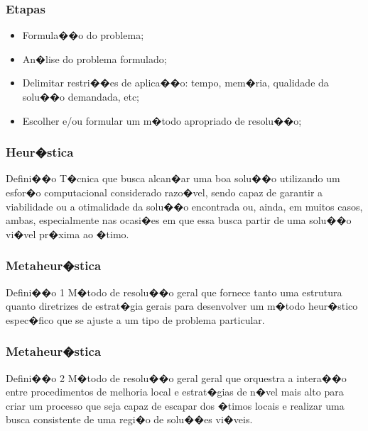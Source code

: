 \documentclass[fleqn]{beamer}
\begin{document}
\begin{frame}
	\frametitle{Etapas}
	\begin{itemize}
		\item Formula��o do problema;
		\item An�lise do problema formulado;
		\item Delimitar restri��es de aplica��o: tempo, mem�ria, qualidade da solu��o demandada, etc;
		\item Escolher e/ou formular um m�todo apropriado de resolu��o;
	\end{itemize}
\end{frame}
\begin{frame}
\frametitle{Heur�stica}
\begin{block}{Defini��o \cite{goldbargLuna2005}}
T�cnica que busca alcan�ar uma boa solu��o utilizando um esfor�o computacional considerado razo�vel, sendo capaz de garantir a viabilidade ou a otimalidade da solu��o encontrada ou, ainda, em muitos casos, ambas, especialmente nas ocasi�es em que essa busca partir de uma solu��o vi�vel pr�xima ao �timo.
\end{block}
\end{frame}
\begin{frame}
	\frametitle{Metaheur�stica}
	\begin{block}{Defini��o 1 \cite{hillierLieberman2010}}
		M�todo de resolu��o geral que fornece tanto uma estrutura quanto diretrizes de estrat�gia gerais para desenvolver um m�todo heur�stico espec�fico que se ajuste a um tipo de problema particular.
	\end{block}
\end{frame}
\begin{frame}
	\frametitle{Metaheur�stica}
	\begin{block}{Defini��o 2 \cite{hillierLieberman2010}}
		M�todo de resolu��o geral geral que orquestra a intera��o entre procedimentos de melhoria local e estrat�gias de n�vel mais alto para criar um processo que seja capaz de escapar dos �timos locais e realizar uma busca consistente de uma regi�o de solu��es vi�veis.
	\end{block}
\end{frame}
\end{document}
